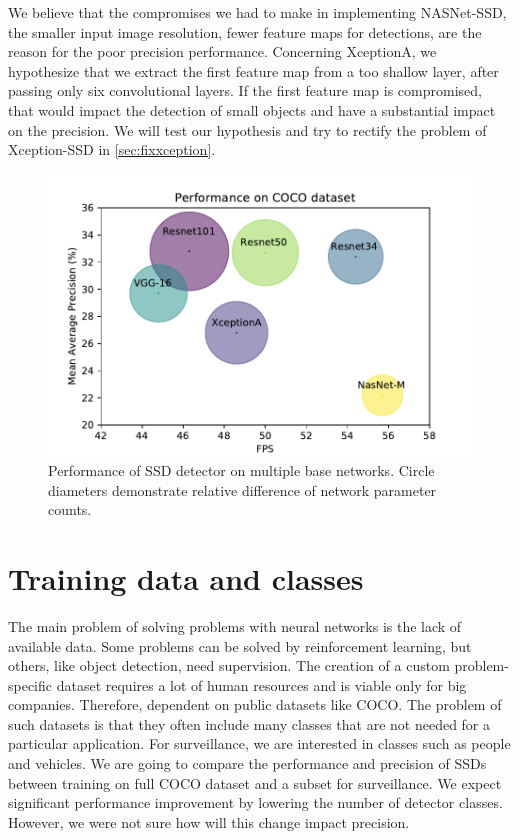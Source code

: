 We believe that the compromises we had to make in implementing NASNet-SSD, the smaller input image resolution, fewer feature maps for detections, are the reason for the poor precision performance. Concerning XceptionA, we hypothesize that we extract the first feature map from a too shallow layer, after passing only six convolutional layers. If the first feature map is compromised, that would impact the detection of small objects and have a substantial impact on the precision. We will test our hypothesis and try to rectify the problem of Xception-SSD in \cref{sec:fixxception}.

\begin{figure}
    \centering
    \includegraphics[width=\textwidth]{img/fps_map_c}
    \caption[Performance of SSD with multiple base networks on COCO dataset]{Performance of SSD detector on multiple base networks. Circle diameters demonstrate relative difference of network parameter counts.}
    \label{fig:cocoperf}
\end{figure}

\section{Training data and classes}
The main problem of solving problems with neural networks is the lack of available data. Some problems can be solved by reinforcement learning, but others, like object detection, need supervision. The creation of a custom problem-specific dataset requires a lot of human resources and is viable only for big companies. Therefore, dependent on public datasets like COCO. The problem of such datasets is that they often include many classes that are not needed for a particular application. For surveillance, we are interested in classes such as people and vehicles. We are going to compare the performance and precision of SSDs between training on full COCO dataset and a subset for surveillance. We expect significant performance improvement by lowering the number of detector classes. However, we were not sure how will this change impact precision. 

